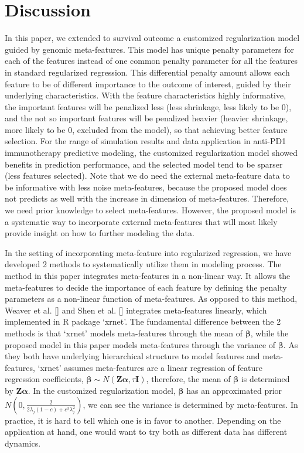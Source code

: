 \section{Discussion}
In this paper, we extended to survival outcome a customized regularization model guided by genomic meta-features. This model has unique penalty parameters for each of the features instead of one common penalty parameter for all the features in standard regularized regression. This differential penalty amount allows each feature to be of different importance to the outcome of interest, guided by their underlying characteristics. With the feature characteristics highly informative, the important features will be penalized less (less shrinkage, less likely to be 0), and the not so important features will be penalized heavier (heavier shrinkage, more likely to be 0, excluded from the model), so that achieving better feature selection. For the range of simulation results and data application in anti-PD1 immunotherapy predictive modeling, the customized regularization model showed benefits in prediction performance, and the selected model tend to be sparser (less features selected). Note that we do need the external meta-feature data to be informative with less noise meta-features, because the proposed model does not predicts as well with the increase in dimension of meta-features. Therefore, we need prior knowledge to select meta-features. However, the proposed model is a systematic way to incorporate external meta-features that will most likely provide insight on how to further modeling the data.

In the setting of incorporating meta-feature into regularized regression, we have developed 2 methods to systematically utilize them in modeling process. The method in this paper integrates meta-features in a non-linear way. It allows the meta-features to decide the importance of each feature by defining the penalty parameters as a non-linear function of meta-features. As opposed to this method, Weaver et al. [] and Shen et al. [] integrates meta-features linearly, which implemented in R package `xrnet'. The fundamental difference between the 2 methods is that `xrnet' models meta-features through the mean of $\bm{\beta}$, while the proposed model in this paper models meta-features through the variance of $\bm{\beta}$. As they both have underlying hierarchical structure to model features and meta-features, `xrnet' assumes meta-features are a linear regression of feature regression coefficients, $\bm{\beta} \sim N(\bm{Z\alpha}, \tau\bm{I})$, therefore, the mean of $\bm{\beta}$ is determined by $\bm{Z\alpha}$. In the customized regularization model, $\bm{\beta}$ has an approximated prior $N(0, \frac{2}{2\lambda_j(1-c)+c^2\lambda_j^2})$, we can see the variance is determined by meta-features. In practice, it is hard to tell which one is in favor to another. Depending on the application at hand, one would want to try both as different data has different dynamics. 

